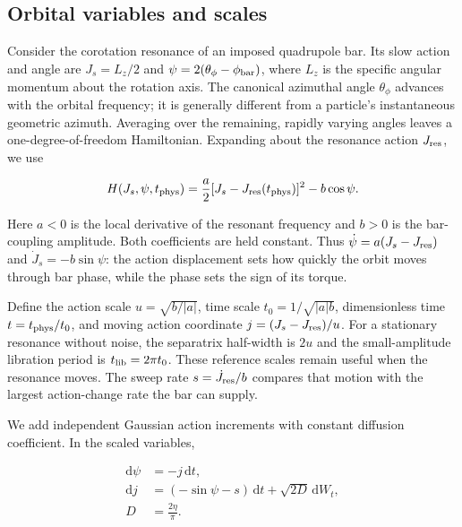 \documentclass[fleqn,usenatbib]{mnras}
\begin{document}
\subsection{Orbital variables and scales}\label{orbital-variables-and-scales}

Consider the corotation resonance of an imposed quadrupole bar. Its slow action and angle are \(J_s=L_z/2\) and \(\psi=2(\theta_\phi-\phi_{\rm bar})\), where \(L_z\) is the specific angular momentum about the rotation axis. The canonical azimuthal angle \(\theta_\phi\) advances with the orbital frequency; it is generally different from a particle's instantaneous geometric azimuth. Averaging over the remaining, rapidly varying angles leaves a one-degree-of-freedom Hamiltonian. Expanding about the resonance action \(J_{\rm res}\), we use

\begin{equation}\label{EQ-HAM-01}
H(J_s,\psi,t_{\rm phys})=
\frac{a}{2}[J_s-J_{\rm res}(t_{\rm phys})]^2-b\cos\psi.
\end{equation}

Here \(a<0\) is the local derivative of the resonant frequency and \(b>0\) is the bar-coupling amplitude. Both coefficients are held constant. Thus \(\dot\psi=a(J_s-J_{\rm res})\) and \(\dot J_s=-b\sin\psi\): the action displacement sets how quickly the orbit moves through bar phase, while the phase sets the sign of its torque.

Define the action scale \(u=\sqrt{b/|a|}\), time scale \(t_0=1/\sqrt{|a|b}\), dimensionless time \(t=t_{\rm phys}/t_0\), and moving action coordinate \(j=(J_s-J_{\rm res})/u\). For a stationary resonance without noise, the separatrix half-width is \(2u\) and the small-amplitude libration period is \(t_{\rm lib}=2\pi t_0\). These reference scales remain useful when the resonance moves. The sweep rate \(s=\dot J_{\rm res}/b\) compares that motion with the largest action-change rate the bar can supply.

We add independent Gaussian action increments with constant diffusion coefficient. In the scaled variables,

\begin{equation}\label{EQ-DYN-01}
\begin{aligned}
\mathrm d\psi&=-j\,\mathrm dt,\\
\mathrm dj&=(-\sin\psi-s)\,\mathrm dt+\sqrt{2D}\,\mathrm dW_t,\\
D&=\frac{2\eta}{\pi}.
\end{aligned}
\end{equation}
\end{document}
